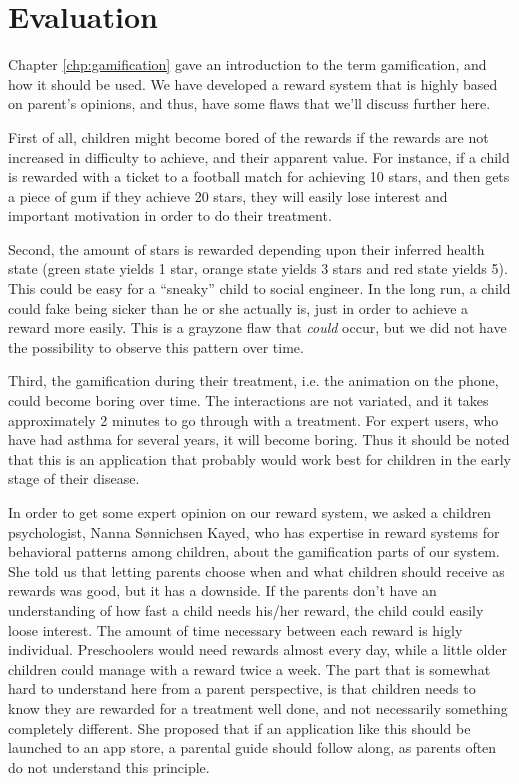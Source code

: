  
\section{Evaluation}
\label{sec:asthmappevaluation}
Chapter \ref{chp:gamification} gave an introduction to the term gamification, and how it should be used. We have developed a reward system that is highly based on parent's opinions, and thus, have some flaws that we'll discuss further here.

First of all, children might become bored of the rewards if the rewards are not increased in difficulty to achieve, and their apparent value. For instance, if a child is rewarded with a ticket to a football match for achieving 10 stars, and then gets a piece of gum if they achieve 20 stars, they will easily lose interest and important motivation in order to do their treatment. 

Second, the amount of stars is rewarded depending upon their inferred health state (green state yields 1 star, orange state yields 3 stars and red state yields 5). This could be easy for a ``sneaky'' child to social engineer. In the long run, a child could fake being sicker than he or she actually is, just in order to achieve a reward more easily. This is a grayzone flaw that \emph{could} occur, but we did not have the possibility to observe this pattern over time.

Third, the gamification during their treatment, i.e. the animation on the phone, could become boring over time. 
The interactions are not variated, and it takes approximately 2 minutes to go through with a treatment. For expert users, who have had asthma for several years, it will become boring. Thus it should be noted that this is an application that probably would work best for children in the early stage of their disease.      

In order to get some expert opinion on our reward system, we asked a children psychologist, Nanna S\o nnichsen Kayed, who has expertise in reward systems for behavioral patterns among children, about the gamification parts of our system. 
She told us that letting parents choose when and what children should receive as rewards was good, but it has a downside. If the parents don't have an understanding of how fast a child needs his/her reward, the child could easily loose interest. The amount of time necessary between each reward is higly individual. Preschoolers would need rewards almost every day, while a little older children could manage with a reward twice a week. The part that is somewhat hard to understand here from a parent perspective, is that children needs to know they are rewarded for a treatment well done, and not necessarily something completely different. She proposed that if an application like this should be launched to an app store, a parental guide should follow along, as parents often do not understand this principle.

